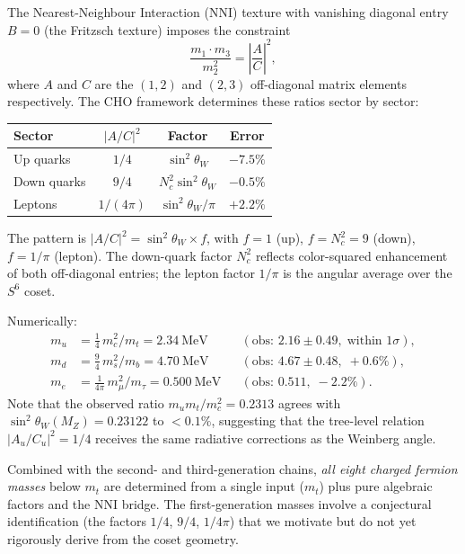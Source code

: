 \documentclass[12pt,a4paper]{article}
\theoremstyle{definition}
\theoremstyle{remark}
\begin{document}
The Nearest-Neighbour Interaction (NNI) texture with vanishing diagonal entry 
$B = 0$ (the Fritzsch texture) imposes the constraint
\begin{equation}
\frac{m_1 \cdot m_3}{m_2^2} = \left|\frac{A}{C}\right|^2,
\label{eq:nni_constraint}
\end{equation}
where $A$ and $C$ are the $(1,2)$ and $(2,3)$ off-diagonal matrix elements 
respectively. The CHO framework determines these ratios sector by sector:
\begin{center}
\begin{tabular}{lccc}
\hline
Sector & $|A/C|^2$ & Factor & Error \\
\hline
Up quarks & $1/4$ & $\sin^2\theta_W$ & $-7.5\%$ \\
Down quarks & $9/4$ & $N_c^2 \sin^2\theta_W$ & $-0.5\%$ \\
Leptons & $1/(4\pi)$ & $\sin^2\theta_W/\pi$ & $+2.2\%$ \\
\hline
\end{tabular}
\end{center}
The pattern is $|A/C|^2 = \sin^2\theta_W \times f$, with $f = 1$ (up), 
$f = N_c^2 = 9$ (down), $f = 1/\pi$ (lepton). The down-quark factor 
$N_c^2$ reflects color-squared enhancement of both off-diagonal entries; 
the lepton factor $1/\pi$ is the angular average over the $S^6$ coset.

Numerically:
\begin{align}
m_u &= \tfrac{1}{4}\,m_c^2/m_t = 2.34~\text{MeV} 
  && (\text{obs: } 2.16 \pm 0.49,\;\text{within } 1\sigma), \nonumber\\
m_d &= \tfrac{9}{4}\,m_s^2/m_b = 4.70~\text{MeV}
  && (\text{obs: } 4.67 \pm 0.48,\; +0.6\%), \nonumber\\
m_e &= \tfrac{1}{4\pi}\,m_\mu^2/m_\tau = 0.500~\text{MeV}
  && (\text{obs: } 0.511,\; -2.2\%).
\end{align}
Note that the observed ratio $m_u m_t / m_c^2 = 0.2313$ agrees with 
$\sin^2\theta_W(M_Z) = 0.23122$ to $< 0.1\%$, suggesting that the 
tree-level relation $|A_u/C_u|^2 = 1/4$ receives the same radiative 
corrections as the Weinberg angle.

Combined with the second- and third-generation chains, \emph{all eight 
charged fermion masses} below $m_t$ are determined from a single input 
($m_t$) plus pure algebraic factors and the NNI bridge. The first-generation 
masses involve a conjectural identification (the factors $1/4$, $9/4$, $1/4\pi$) 
that we motivate but do not yet rigorously derive from the coset geometry.
\end{document}
